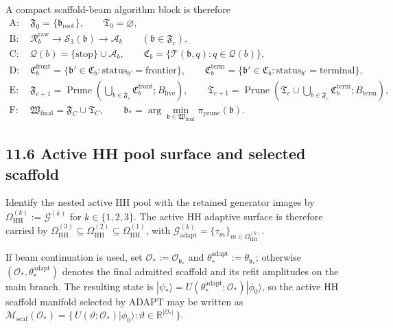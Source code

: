 \documentclass[11pt]{article}
\begin{document}
A compact scaffold-beam algorithm block is therefore
\[
\begin{aligned}
\text{A: }&
\mathfrak F_0=\{\mathfrak b_{\mathrm{root}}\},
\qquad
\mathfrak T_0=\varnothing,\\
\text{B: }&
\mathcal R_b^{\mathrm{raw}}
\to
\mathcal S_3(\mathfrak b)
\to
\mathcal A_b
\qquad(\mathfrak b\in\mathfrak F_c),\\
\text{C: }&
\mathcal Q(b)=\{\mathrm{stop}\}\cup\mathcal A_b,
\qquad
\mathfrak C_b=\{\mathcal T(\mathfrak b,q):q\in\mathcal Q(b)\},\\
\text{D: }&
\mathfrak C_b^{\mathrm{front}}
=
\{\mathfrak b'\in\mathfrak C_b:\mathrm{status}_{b'}=\mathrm{frontier}\},
\qquad
\mathfrak C_b^{\mathrm{term}}
=
\{\mathfrak b'\in\mathfrak C_b:\mathrm{status}_{b'}=\mathrm{terminal}\},\\
\text{E: }&
\mathfrak F_{c+1}
=
\operatorname{Prune}\!\left(\bigcup_{b\in\mathfrak F_c}\mathfrak C_b^{\mathrm{front}};B_{\mathrm{live}}\right),
\qquad
\mathfrak T_{c+1}
=
\operatorname{Prune}\!\left(\mathfrak T_c\cup\bigcup_{b\in\mathfrak F_c}\mathfrak C_b^{\mathrm{term}};B_{\mathrm{term}}\right),\\
\text{F: }&
\mathfrak W_{\mathrm{final}}=\mathfrak F_C\cup\mathfrak T_C,
\qquad
\mathfrak b_*=\arg\min_{\mathfrak b\in\mathfrak W_{\mathrm{final}}}\pi_{\mathrm{prune}}(\mathfrak b).
\end{aligned}
\]

\subsection*{11.6 Active HH pool surface and selected scaffold}
Identify the nested active HH pool with the retained generator images by \(\Omega_{\mathrm{HH}}^{(k)}:=\mathcal G^{(k)}\) for \(k\in\{1,2,3\}\). The active HH adaptive surface is therefore carried by \(\Omega_{\mathrm{HH}}^{(3)}\subseteq\Omega_{\mathrm{HH}}^{(2)}\subseteq\Omega_{\mathrm{HH}}^{(1)}\), with \(\mathcal G_{\mathrm{adapt}}^{(k)}=\{\tau_m\}_{m\in\Omega_{\mathrm{HH}}^{(k)}}\).

If beam continuation is used, set \(\mathcal O_*:=\mathcal O_{\mathfrak b_*}\) and \(\theta_*^{\mathrm{adapt}}:=\theta_{\mathfrak b_*}\); otherwise \((\mathcal O_*,\theta_*^{\mathrm{adapt}})\) denotes the final admitted scaffold and its refit amplitudes on the main branch. The resulting state is \(|\psi_*\rangle=U(\theta_*^{\mathrm{adapt}};\mathcal O_*)|\phi_0\rangle\), so the active HH scaffold manifold selected by ADAPT may be written as \(\mathcal M_{\mathrm{scaf}}(\mathcal O_*)=\{\,U(\vartheta;\mathcal O_*)|\phi_0\rangle:\vartheta\in\mathbb R^{|\mathcal O_*|}\,\}\).
\end{document}
